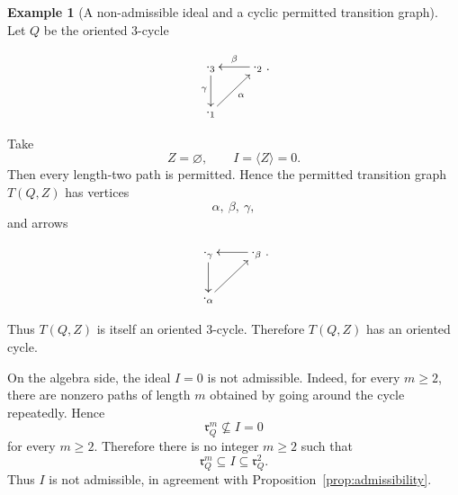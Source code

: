 \documentclass[11pt]{article}
\newcommand{\rad}{\mathfrak r}
\theoremstyle{plain}
\theoremstyle{definition}
\newtheorem{example}[theorem]{Example}
\theoremstyle{remark}
\begin{document}
\begin{example}[A non-admissible ideal and a cyclic permitted transition graph]
Let \(Q\) be the oriented \(3\)-cycle

\begin{equation}\label{}
\nonumber \xymatrix{
\cdot_{3} \ar[d]_{\gamma} & \ar[l]_{\beta}\cdot_{2} \\
	\cdot_{1}  \ar[ur]_{\alpha}}.
  \end{equation}

Take
\[
Z=\varnothing,
\qquad
I=\langle Z\rangle=0.
\]
Then every length-two path is permitted. Hence the permitted transition graph
\(T(Q,Z)\) has vertices
\[
\alpha,\ \beta,\ \gamma,
\]
and arrows

\begin{equation}\label{}
\nonumber \xymatrix{
\cdot_{\gamma} \ar[d] & \ar[l]\cdot_{\beta} \\
	\cdot_{\alpha}  \ar[ur]}.
  \end{equation}

Thus \(T(Q,Z)\) is itself an oriented \(3\)-cycle. Therefore \(T(Q,Z)\) has an oriented cycle.

On the algebra side, the ideal \(I=0\) is not admissible. Indeed, for every
\(m\geq 2\), there are nonzero paths of length \(m\) obtained by going around
the cycle repeatedly. Hence
\[
\rad_Q^m \nsubseteq I=0
\]
for every \(m\geq 2\). Therefore there is no integer \(m\geq 2\) such that
\[
\rad_Q^m\subseteq I\subseteq \rad_Q^2.
\]
Thus \(I\) is not admissible, in agreement with Proposition~\ref{prop:admissibility}.
\end{example}
\end{document}
